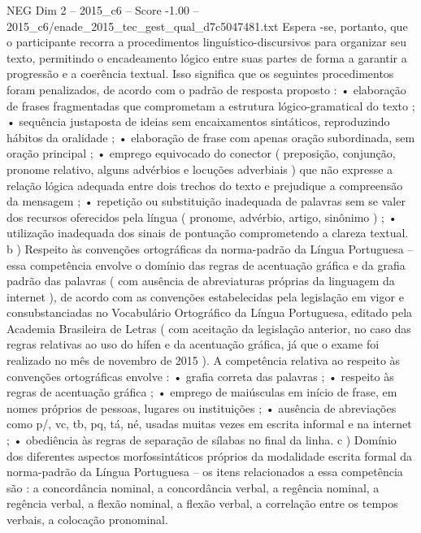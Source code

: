 \begin{textsample}{NEG Dim 2 – 2015\_c6 – Score -1.00 – 2015\_c6/enade\_2015\_tec\_gest\_qual\_d7c5047481.txt}
Espera -se, portanto, que o participante recorra a procedimentos linguístico-discursivos para organizar seu texto, permitindo o encadeamento lógico entre suas partes de forma a garantir a progressão e a coerência textual.
Isso significa que os seguintes procedimentos foram penalizados, de acordo com o padrão de resposta proposto : • elaboração de frases fragmentadas que comprometam a estrutura lógico-gramatical do texto ; • sequência justaposta de ideias sem encaixamentos sintáticos, reproduzindo hábitos da oralidade ; • elaboração de frase com apenas oração subordinada, sem oração principal ; • emprego equivocado do conector ( preposição, conjunção, pronome relativo, alguns advérbios e locuções adverbiais ) que não expresse a relação lógica adequada entre dois trechos do texto e prejudique a compreensão da mensagem ; • repetição ou substituição inadequada de palavras sem se valer dos recursos oferecidos pela língua ( pronome, advérbio, artigo, sinônimo ) ; • utilização inadequada dos sinais de pontuação comprometendo a clareza textual. b ) Respeito às convenções ortográficas da norma-padrão da Língua Portuguesa – essa competência envolve o domínio das regras de acentuação gráfica e da grafia padrão das palavras ( com ausência de abreviaturas próprias da linguagem da internet ), de acordo com as convenções estabelecidas pela legislação em vigor e consubstanciadas no Vocabulário Ortográfico da Língua Portuguesa, editado pela Academia Brasileira de Letras ( com aceitação da legislação anterior, no caso das regras relativas ao uso do hífen e da acentuação gráfica, já que o exame foi realizado no mês de novembro de 2015 ).
A competência relativa ao respeito às convenções ortográficas envolve : • grafia correta das palavras ; • respeito às regras de acentuação gráfica ; • emprego de maiúsculas em início de frase, em nomes próprios de pessoas, lugares ou instituições ; • ausência de abreviações como p/, vc, tb, pq, tá, né, usadas muitas vezes em escrita informal e na internet ; • obediência às regras de separação de sílabas no final da linha. c ) Domínio dos diferentes aspectos morfossintáticos próprios da modalidade escrita formal da norma-padrão da Língua Portuguesa – os itens relacionados a essa competência são : a concordância nominal, a concordância verbal, a regência nominal, a regência verbal, a flexão nominal, a flexão verbal, a correlação entre os tempos verbais, a colocação pronominal.

\end{textsample}
